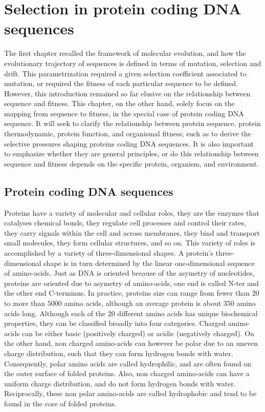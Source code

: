 \chapter{Selection in protein coding {DNA} sequences}
\minitoc
\label{sec:selection}
The first chapter recalled the framework of molecular evolution, and how the evolutionary trajectory of sequences is defined in terms of mutation, selection and drift. 
This parametrization required a given selection coefficient associated to mutation, or required the fitness of each particular sequence to be defined.
However, this introduction remained so far elusive on the relationship between sequence and fitness.
This chapter, on the other hand, solely focus on the mapping from sequence to fitness, in the special case of protein coding \acrshort{DNA} sequence.
It will seek to clarify the relationship between protein sequence, protein thermodynamic, protein function, and organismal fitness, such as to derive the selective pressures shaping proteins coding \acrshort{DNA} sequences.
It is also important to emphasize whether they are general principles, or do this relationship between sequence and fitness depends on the specific protein, organism, and environment.

\section{Protein coding DNA sequences}

Proteins have a variety of molecular and cellular roles, they are the enzymes that catalyses chemical bonds, they regulate cell processes and control their rates, they carry signals within the cell and across membranes, they bind and transport small molecules, they form cellular structures, and so on.
This variety of roles is accomplished by a variety of three-dimensional shapes.
A protein's three-dimensional shape is in turn determined by the linear one-dimensional sequence of amino-acids.
Just as \acrshort{DNA} is oriented because of the asymetry of nucleotides, proteins are oriented due to asymetry of amino-acids, one end is called \gls{N-ter} and the other end C-terminus. 
In practice, proteins size can range from fewer than $20$ to more than $5000$ amino acids, although an average protein is about 350 amino acids long.
Although each of the 20 different amino acids has unique biochemical properties, they can be classified broadly into four categories.
Charged amino-acids can be either basic (positively charged) or acidic (negatively charged).
On the other hand, non charged amino-acids can however be polar due to an uneven charge distribution, such that they can form hydrogen bonds with water.
Consequently, polar amino acids are called hydrophilic, and are often found on the outer surface of folded proteins.
Also, non charged amino-acids can have a uniform charge distribution, and do not form hydrogen bonds with water.
Reciprocally, these non polar amino-acids are called hydrophobic and tend to be found in the core of folded proteins.

